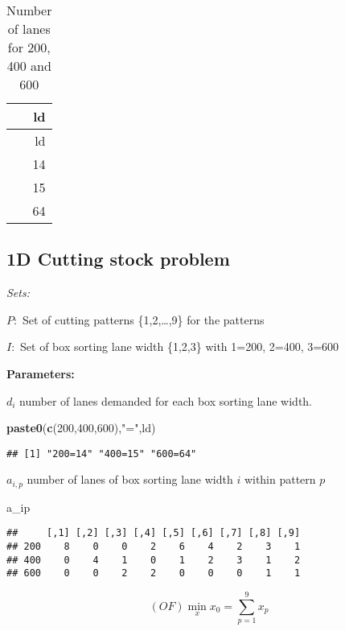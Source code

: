 \documentclass[
]{article}
\newenvironment{Shaded}{\begin{snugshade}}{\end{snugshade}}
\newcommand{\DecValTok}[1]{\textcolor[rgb]{0.00,0.00,0.81}{#1}}
\newcommand{\KeywordTok}[1]{\textcolor[rgb]{0.13,0.29,0.53}{\textbf{#1}}}
\newcommand{\NormalTok}[1]{#1}
\newcommand{\StringTok}[1]{\textcolor[rgb]{0.31,0.60,0.02}{#1}}
\begin{document}
\begin{longtable}[]{@{}r@{}}
\caption{Number of lanes for 200, 400 and 600}\tabularnewline
\toprule
ld\tabularnewline
\midrule
\endfirsthead
\toprule
ld\tabularnewline
\midrule
\endhead
14\tabularnewline
15\tabularnewline
64\tabularnewline
\bottomrule
\end{longtable}

\hypertarget{d-cutting-stock-problem}{%
\subsection{1D Cutting stock problem}\label{d-cutting-stock-problem}}

\emph{Sets:}

\(P:\) Set of cutting patterns \{1,2,\ldots{},9\} for the patterns

\(I:\) Set of box sorting lane width \{1,2,3\} with 1=200, 2=400, 3=600

\textbf{Parameters:}

\(d_i\) number of lanes demanded for each box sorting lane width.

\begin{Shaded}
\begin{Highlighting}[]
\KeywordTok{paste0}\NormalTok{(}\KeywordTok{c}\NormalTok{(}\DecValTok{200}\NormalTok{,}\DecValTok{400}\NormalTok{,}\DecValTok{600}\NormalTok{),}\StringTok{"="}\NormalTok{,ld)}
\end{Highlighting}
\end{Shaded}

\begin{verbatim}
## [1] "200=14" "400=15" "600=64"
\end{verbatim}

\(a_{i,p}\) number of lanes of box sorting lane width \(i\) within
pattern \(p\)

\begin{Shaded}
\begin{Highlighting}[]
\NormalTok{a_ip}
\end{Highlighting}
\end{Shaded}

\begin{verbatim}
##     [,1] [,2] [,3] [,4] [,5] [,6] [,7] [,8] [,9]
## 200    8    0    0    2    6    4    2    3    1
## 400    0    4    1    0    1    2    3    1    2
## 600    0    0    2    2    0    0    0    1    1
\end{verbatim}

\[ (OF) \min_x x_0= \sum_{p=1}^9 x_p\]
\end{document}
